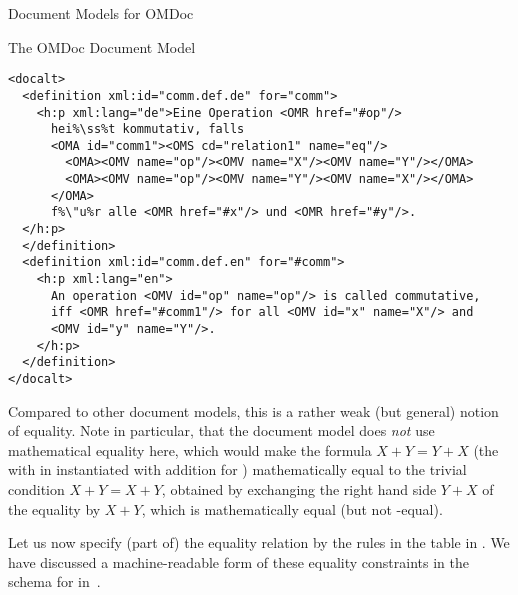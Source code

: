 \begin{module}[id=document-model]
\begin{omgroup}[id=document-model]{Document Models for OMDoc}
\begin{omgroup}[id=omdom]{The OMDoc Document Model}
\begin{module}[id=omdom]
\begin{lstlisting}[escapechar=\%,label=lst:third,
   index={definition,docalt,OMA},
   caption={An \omdoc-Equal Representation for {\mylstsref{first}{second}}}]
<docalt>
  <definition xml:id="comm.def.de" for="comm">
    <h:p xml:lang="de">Eine Operation <OMR href="#op"/> 
      hei%\ss%t kommutativ, falls 
      <OMA id="comm1"><OMS cd="relation1" name="eq"/>
        <OMA><OMV name="op"/><OMV name="X"/><OMV name="Y"/></OMA>
        <OMA><OMV name="op"/><OMV name="Y"/><OMV name="X"/></OMA>
      </OMA>
      f%\"u%r alle <OMR href="#x"/> und <OMR href="#y"/>.
  </h:p>
  </definition>
  <definition xml:id="comm.def.en" for="#comm">
    <h:p xml:lang="en">
      An operation <OMV id="op" name="op"/> is called commutative, 
      iff <OMR href="#comm1"/> for all <OMV id="x" name="X"/> and 
      <OMV id="y" name="Y"/>.
    </h:p>
  </definition>
</docalt>
\end{lstlisting}

Compared to other document models, this is a rather weak (but general) notion of
equality. Note in particular, that the \omdoc document model does {\emph{not}}
use mathematical equality here, which would make the formula $X+Y=Y+X$ (the
 with {} in
{} instantiated with addition for {}) mathematically
equal to the trivial condition $X+Y=X+Y$, obtained by exchanging the right hand
side $Y+X$ of the equality by $X+Y$, which is mathematically equal (but not
\omdoc-equal).

Let us now specify (part of) the equality relation by the rules in the table in
{}.  We have discussed a machine-readable form of these equality
constraints in the {\xml} schema for \omdoc in~\cite{KohAng:tccmvc03}.


\end{module}
\end{omgroup}
\end{omgroup}
\end{module}
